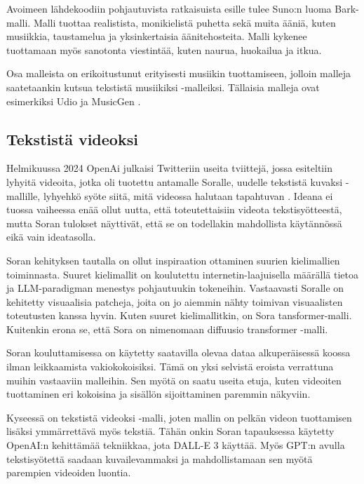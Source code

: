 Avoimeen lähdekoodiin pohjautuvista ratkaisuista esille tulee Suno:n luoma
Bark-malli. Malli tuottaa realistista, monikielistä puhetta sekä muita ääniä,
kuten musiikkia, taustamelua ja yksinkertaisia äänitehosteita. Malli kykenee
tuottamaan myös sanotonta viestintää, kuten naurua, huokailua ja itkua.
\parencite{githubSunoAiBark}

Osa malleista on erikoitustunut erityisesti musiikin tuottamiseen, jolloin
malleja saatetaankin kutsua tekstistä musiikiksi -malleiksi. Tällaisia malleja
ovat esimerkiksi Udio \parencite{udioAboutUs} ja MusicGen
\parencite{copet2024simplecontrollablemusicgeneration}.

\subsection{Tekstistä videoksi}

Helmikuussa 2024 OpenAi julkaisi Twitteriin useita tviittejä, jossa esiteltiin
lyhyitä videoita, jotka oli tuotettu antamalle Soralle, uudelle tekstistä
kuvaksi -mallille, lyhyehkö syöte siitä, mitä videossa halutaan tapahtuvan
\parencite{twitter1758192957386342435}. Ideana ei tuossa vaiheessa enää ollut
uutta, että toteutettaisiin videota tekstisyötteestä, mutta Soran tulokset
näyttivät, että se on todellakin mahdollista käytännössä eikä vain ideatasolla.

Soran kehityksen tautalla on ollut inspiraation ottaminen suurien kielimallien
toiminnasta. Suuret kielimallit on koulutettu internetin-laajuisella määrällä
tietoa ja LLM-paradigman menestys pohjautuukin tokeneihin. Vastaavasti Soralle
on kehitetty visuaalisia patcheja, joita on jo aiemmin nähty toimivan
visuaalisten toteutusten kanssa hyvin. Kuten suuret kielimallitkin, on Sora
tansformer-malli. Kuitenkin erona se, että Sora on nimenomaan diffuusio
transformer -malli. \parencite{openAISoraReport}

Soran kouluttamisessa on käytetty saatavilla olevaa dataa alkuperäisessä koossa
ilman leikkaamista vakiokokoisiksi. Tämä on yksi selvistä eroista verrattuna
muihin vastaaviin malleihin. Sen myötä on saatu useita etuja, kuten videoiten
tuottaminen eri kokoisina ja sisällön sijoittaminen paremmin näkyviin.
\parencite{openAISoraReport}

Kyseessä on tekstistä videoksi -malli, joten mallin on pelkän videon
tuottamisen lisäksi ymmärrettävä myös tekstiä. Tähän onkin Soran tapauksessa
käytetty OpenAI:n kehittämää tekniikkaa, jota DALL-E 3 käyttää. Myös GPT:n
avulla tekstisyötettä saadaan kuvailevammaksi ja mahdollistamaan sen myötä
parempien videoiden luontia. \parencite{openAISoraReport}


